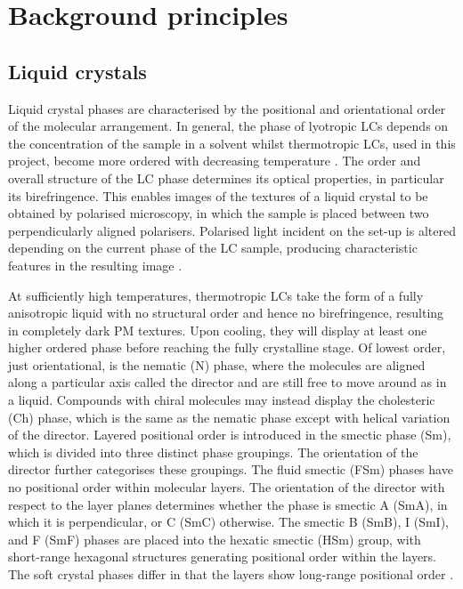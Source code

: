 \documentclass[12pt]{article}
\begin{document}
\section{Background principles}
\subsection{Liquid crystals}
Liquid crystal phases are characterised by the positional and orientational order of the molecular arrangement. In general, the phase of lyotropic LCs depends on the concentration of the sample in a solvent whilst thermotropic LCs, used in this project, become more ordered with decreasing temperature \cite{Dierking03}. The order and overall structure of the LC phase determines its optical properties, in particular its birefringence. This enables images of the textures of a liquid crystal to be obtained by polarised microscopy, in which the sample is placed between two perpendicularly aligned polarisers. Polarised light incident on the set-up is altered depending on the current phase of the LC sample, producing characteristic features in the resulting image \cite{Dierking03}.

At sufficiently high temperatures, thermotropic LCs take the form of a fully anisotropic liquid with no structural order and hence no birefringence, resulting in completely dark PM textures. Upon cooling, they will display at least one higher ordered phase before reaching the fully crystalline stage. Of lowest order, just orientational, is the nematic (N) phase, where the molecules are aligned along a particular axis called the director and are still free to move around as in a liquid. Compounds with chiral molecules may instead display the cholesteric (Ch) phase, which is the same as the nematic phase except with helical variation of the director. Layered positional order is introduced in the smectic phase (Sm), which is divided into three distinct phase groupings. The orientation of the director further categorises these groupings. The fluid smectic (FSm) phases have no positional order within molecular layers. The orientation of the director with respect to the layer planes determines whether the phase is smectic A (SmA), in which it is perpendicular, or C (SmC) otherwise. The smectic B (SmB), I (SmI), and F (SmF) phases are placed into the hexatic smectic (HSm) group, with short-range hexagonal structures generating positional order within the layers. The soft crystal phases differ in that the layers show long-range positional order \cite{Dierking03}.
\end{document}
